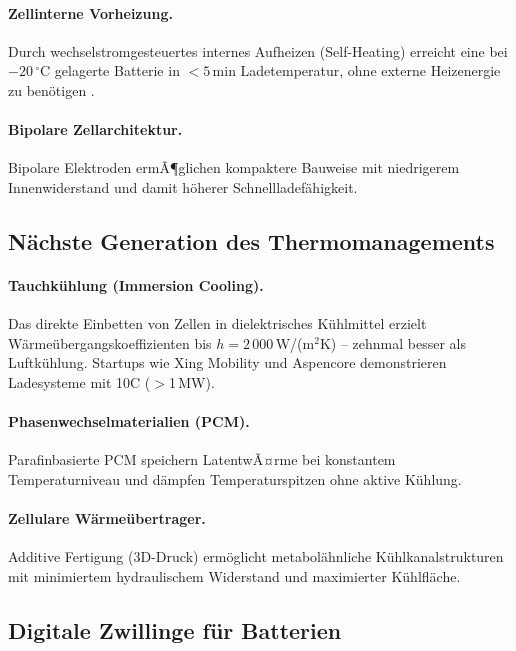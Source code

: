 ﻿\documentclass[a4paper,12pt]{article}
\theoremstyle{definition}
\begin{document}
\paragraph{Zellinterne Vorheizung.}
Durch wechselstromgesteuertes internes Aufheizen (Self-Heating) erreicht
eine bei $-20\,^{\circ}\mathrm{C}$ gelagerte Batterie in $<5$\,min Ladetemperatur, ohne
externe Heizenergie zu ben\"otigen \cite{Wang2019}.

\paragraph{Bipolare Zellarchitektur.}
Bipolare Elektroden ermÃ¶glichen kompaktere Bauweise mit niedrigerem
Innenwiderstand und damit h\"oherer Schnellladef\"ahigkeit.

\subsection{N\"achste Generation des Thermomanagements}

\paragraph{Tauchk\"uhlung (Immersion Cooling).}
Das direkte Einbetten von Zellen in dielektrisches K\"uhlmittel erzielt
W\"arme\"ubergangskoeffizienten bis $h = 2\,000$\,W/(m$^2$K) --
zehnmal besser als Luftk\"uhlung. Startups wie Xing Mobility und
Aspencore demonstrieren Ladesysteme mit 10C ($>$1\,MW).

\paragraph{Phasenwechselmaterialien (PCM).}
Parafinbasierte PCM speichern LatentwÃ¤rme bei konstantem Temperaturniveau
und d\"ampfen Temperaturspitzen ohne aktive K\"uhlung.

\paragraph{Zellulare W\"arme\"ubertrager.}
Additive Fertigung (3D-Druck) erm\"oglicht metabol\"ahnliche K\"uhlkanalstrukturen
mit minimiertem hydraulischem Widerstand und maximierter K\"uhlfl\"ache.

\subsection{Digitale Zwillinge f\"ur Batterien}
\end{document}
